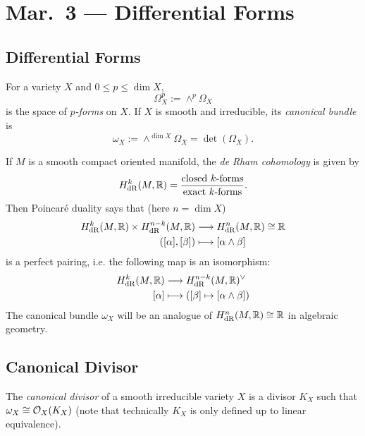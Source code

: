 \chapter{Mar.~3 --- Differential Forms}

\section{Differential Forms}

\begin{definition}
  For a variety $X$ and
  $0 \le p \le \dim X$,
  \[
    \Omega_X^p := \wedge^p \Omega_X
  \]
  is the space of \emph{$p$-forms}
  on $X$. If $X$ is smooth and
  irreducible, its \emph{canonical bundle}
  is
  \[
    \omega_X := \wedge^{\dim X} \Omega_X
    = \det(\Omega_X).
  \]
\end{definition}

\begin{remark}
  If $M$ is a smooth compact oriented
  manifold, the \emph{de Rham cohomology}
  is given by
  \[
    H_{\mathrm{dR}}^k(M, \mathbb{R})
    = \frac{\text{closed $k$-forms}}{\text{exact $k$-forms}}.
  \]
  Then Poincar\'e duality says that
  (here $n = \dim X$)
  \begin{align*}
    H_{\mathrm{dR}}^k(M, \mathbb{R}) \times H_{\mathrm{dR}}^{n - k}(M, \mathbb{R})
    &\longrightarrow H_{\mathrm{dR}}^n(M, \mathbb{R}) \cong \mathbb{R} \\
    ([\alpha], [\beta]) &\longmapsto [\alpha \wedge \beta]
  \end{align*}
  is a perfect pairing, i.e. the following
  map is an isomorphism:
  \begin{align*}
    H_{\mathrm{dR}}^k(M, \mathbb{R}) &\longrightarrow H_{\mathrm{dR}}^{n - k}(M, \mathbb{R})^\vee \\
    [\alpha] &\longmapsto ([\beta] \mapsto [\alpha \wedge \beta])
  \end{align*}
  The canonical bundle $\omega_X$ will be an
  analogue of
  $H_{\mathrm{dR}}^n(M, \mathbb{R}) \cong \mathbb{R}$ in
  algebraic geometry.
\end{remark}

\section{Canonical Divisor}
\begin{definition}
  The \emph{canonical divisor} of a smooth
  irreducible variety $X$ is a divisor
  $K_X$ such that $\omega_X \cong \mathcal{O}_X(K_X)$ (note that technically
  $K_X$ is only defined up to linear
  equivalence).
\end{definition}

